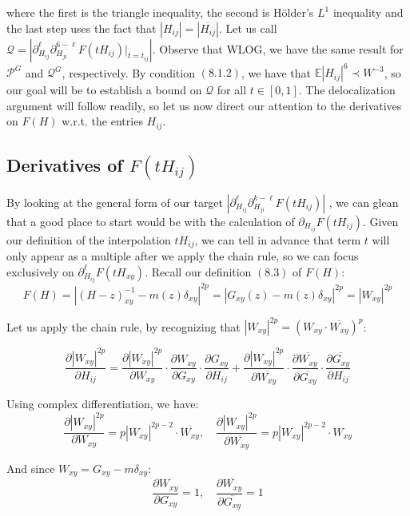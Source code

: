 \documentclass[11pt]{article}
\begin{document}
where the first is the triangle inequality, the second is Hölder's $L^1$ inequality and the last step uses the fact that $|H_{ij}| = \left\vert\overline{H_{ij}}\right\vert$. Let us call $\mathcal{Q}=\left\vert \partial_{H_{ij}}^\ell \partial_{H_{ji}}^{6-\ell} F(tH_{ij})|_{t=t_{ij}}\right\vert$. Observe that WLOG, we have the same result for $\mathcal{P}^G$ and $\mathcal{Q}^G$, respectively. By condition $(8.1.2)$, we have that $\mathbb{E}|H_{ij}|^6\prec W^{-3}$, so our goal will be to establish a bound on $\mathcal{Q}$ for all $t\in [0, 1]$. The delocalization argument will follow readily, so let us now direct our attention to the derivatives on $F(H)$ w.r.t. the entries $H_{ij}$. 

\subsection{Derivatives of $F(tH_{ij})$}
By looking at the general form of our target $\left\vert \partial_{H_{ij}}^\ell \partial_{H_{ji}}^{k-\ell} F(tH_{ij})\right\vert$ , we can glean that a good place to start would be with the calculation of $\partial_{H_{ij}}F(tH_{ij})$. Given our definition of the interpolation $tH_{ij}$, we can tell in advance that term $t$ will only appear as a multiple after we apply the chain rule, so we can focus exclusively on $\partial_{H_{ij}}^\ell F(tH_{xy})$. Recall our definition $(8.3)$ of $F(H)$: 
$$F(H) = \left\vert (H-z)_{xy}^{-1} - m(z)\delta_{xy} \right\vert ^{2p} = \left\vert G_{xy}(z)-m(z)\delta_{xy} \right\vert ^{2p} = |W_{xy}|^{2p}
$$

\noindent Let us apply the chain rule, by recognizing that $|W_{xy}|^{2p} = \left(W_{xy} \cdot \overline{W_{xy}}\right)^p$:

$$\frac{\partial |W_{xy}|^{2p}}{\partial H_{ij}} = \frac{\partial |W_{xy}|^{2p}}{\partial W_{xy}} \cdot \frac{\partial W_{xy}}{\partial G_{xy}} \cdot \frac{\partial G_{xy}}{\partial H_{ij}} + \frac{\partial |W_{xy}|^{2p}}{\partial \overline{W_{xy}}} \cdot \frac{\partial \overline{W_{xy}}}{\partial \overline{G_{xy}}} \cdot \frac{\partial \overline{G_{xy}}}{\partial H_{ij}}$$

\noindent Using complex differentiation, we have: $$\frac{\partial |W_{xy}|^{2p}}{\partial W_{xy}} = p|W_{xy}|^{2p-2} \cdot \overline{W_{xy}}, \quad\frac{\partial |W_{xy}|^{2p}}{\partial \overline{W_{xy}}} = p|W_{xy}|^{2p-2} \cdot W_{xy}$$

\noindent And since $W_{xy} = G_{xy} - m\delta_{xy}$: $$\frac{\partial W_{xy}}{\partial G_{xy}} = 1, \quad \frac{\partial \overline{W_{xy}}}{\partial \overline{G_{xy}}} = 1$$
\end{document}
